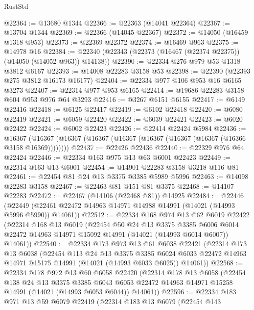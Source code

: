 \begin{lexlean}{RustStd}
\begin{coremodule}
@22364 := @13680 @1344
@22366 := @22363 (@14041 @22364)
@22367 := @13704 @1344
@22369 := @22366 (@14045 @22367)
@22372 := @14050 (@16459 @1318 @953)
@22373 := @22369 @22372
@22374 := @16469 @963
@22375 := @14978 @16
@22384 := @22340 (@22343 (@22373 (@16467 (@22374 @22375)) (@14050 (@14052 @963)) @14138))
@22390 := @22334 @276 @979 @53 @1318 @3812 @6167
@22393 := @14008 @22283 @3158 @53
@22398 := @22390 (@22393 @275 @3812 @16173 @16177)
@22404 := @22334 @977 @106 @953 @16 @6165 @3273
@22407 := @22314 @977 @953 @6165
@22414 := @19686 @22283 @3158 @604 @953 @976 @64 @3293
@22416 := @3267 @6151 @6155
@22417 := @6149 @22416
@22418 := @6125 @22417
@22419 := @6102 @22418
@22420 := @6080 @22419
@22421 := @6059 @22420
@22422 := @6039 @22421
@22423 := @6020 @22422
@22424 := @6002 @22423
@22426 := @22414 @22424 @5984
@22436 := @16367
    (@16367 (@16367 (@16367 (@16367 (@16367 (@16367 (@16367 (@16366 @3158 @16369))))))))
@22437 := @22426 @22436
@22440 := @22329 @976 @64 @22424
@22446 := @22334 @163 @975 @13 @63 @6001 @22423
@22449 := @22314 @163 @13 @6001
@22454 := @14901 @22283 @3158 @3218 @116 @81
@22461 := @22454 @81 @24 @13 @3375 @3385 @5989 @5996
@22463 := @14098 @22283 @3158
@22467 := @22463 @81 @151 @81 @3375
@22468 := @14107 @22283
@22472 := @22467 (@14106 (@22468 @81)) @14925
@22484 := @22446
    (@22449 (@22461 @22472 @14963 @14971 @14988 @14991 (@14021 (@14993 @5996 @5990)) @14061))
@22512 := @22334
    @168
    @974
    @13
    @62
    @6019
    @22422
    (@22314
      @168
      @13
      @6019
      (@22454
        @50
        @24
        @13
        @3375
        @3385
        @6006
        @6014
        @22472
        @14963
        @14971
        @15092
        @14991
        (@14021 (@14993 @6014 @6007))
        @14061))
@22540 := @22334
    @173
    @973
    @13
    @61
    @6038
    @22421
    (@22314
      @173
      @13
      @6038
      (@22454
        @113
        @24
        @13
        @3375
        @3385
        @6024
        @6033
        @22472
        @14963
        @14971
        @15175
        @14991
        (@14021 (@14993 @6033 @6025))
        @14061))
@22568 := @22334
    @178
    @972
    @13
    @60
    @6058
    @22420
    (@22314
      @178
      @13
      @6058
      (@22454
        @138
        @24
        @13
        @3375
        @3385
        @6043
        @6053
        @22472
        @14963
        @14971
        @15258
        @14991
        (@14021 (@14993 @6053 @6044))
        @14061))
@22596 := @22334
    @183
    @971
    @13
    @59
    @6079
    @22419
    (@22314
      @183
      @13
      @6079
      (@22454
        @143

\end{coremodule}
\end{lexlean}
